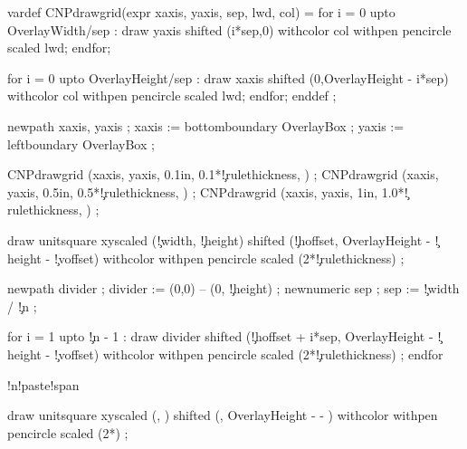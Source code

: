 
\unprotect

\setupcolors[state=start]


\startMPinclusions[+]
  vardef CNPdrawgrid(expr xaxis, yaxis, sep, lwd, col) =
    for i = 0 upto OverlayWidth/sep :
      draw yaxis shifted (i*sep,0) withcolor col withpen pencircle scaled lwd;
    endfor; 

    for i = 0 upto OverlayHeight/sep :
      draw xaxis shifted (0,OverlayHeight - i*sep) withcolor col withpen pencircle scaled lwd;
    endfor; 
  enddef ;
\stopMPinclusions

  newpath xaxis, yaxis ; 
  xaxis := bottomboundary OverlayBox ;
  yaxis := leftboundary   OverlayBox ;

  CNPdrawgrid (xaxis, yaxis, 0.1in, 0.1*\MPvar\c!rulethickness, ) ;
  CNPdrawgrid (xaxis, yaxis, 0.5in, 0.5*\MPvar\c!rulethickness, ) ;
  CNPdrawgrid (xaxis, yaxis, 1in,   1.0*\MPvar\c!rulethickness, ) ;

  draw unitsquare xyscaled (\MPvar\c!width, \MPvar\c!height) 
       shifted (\MPvar\c!hoffset, OverlayHeight - \MPvar\c!height - \MPvar\c!voffset) 
       withcolor 
       withpen pencircle scaled (2*\MPvar\c!rulethickness) ;

  newpath divider ; divider := (0,0) -- (0, \MPvar\c!height) ;
  newnumeric sep  ; sep     := \MPvar\c!width / \MPvar\c!n   ;

  for i = 1 upto \MPvar\c!n - 1 :
    draw divider
         shifted (\MPvar\c!hoffset + i*sep, OverlayHeight - \MPvar\c!height - \MPvar\c!voffset) 
         withcolor 
         withpen pencircle scaled (2*\MPvar\c!rulethickness) ;
  endfor 
       

  \ifconditional\cut!n!paste!span

  draw unitsquare xyscaled (, ) 
       shifted (, OverlayHeight -  - ) 
       withcolor 
       withpen pencircle scaled (2*) ;
  \fi

